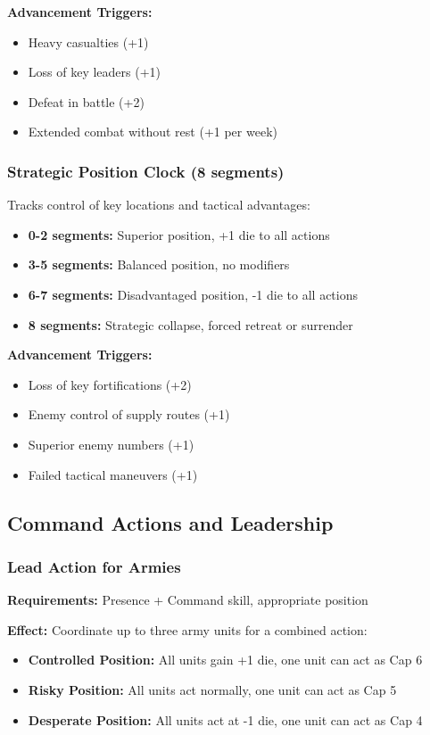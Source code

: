 \textbf{Advancement Triggers:}
\begin{itemize}[leftmargin=*]
    \item Heavy casualties (+1)
    \item Loss of key leaders (+1)
    \item Defeat in battle (+2)
    \item Extended combat without rest (+1 per week)
\end{itemize}

\subsubsection{Strategic Position Clock (8 segments)}
Tracks control of key locations and tactical advantages:
\begin{itemize}[leftmargin=*]
    \item \textbf{0-2 segments:} Superior position, +1 die to all actions
    \item \textbf{3-5 segments:} Balanced position, no modifiers
    \item \textbf{6-7 segments:} Disadvantaged position, -1 die to all actions
    \item \textbf{8 segments:} Strategic collapse, forced retreat or surrender
\end{itemize}

\textbf{Advancement Triggers:}
\begin{itemize}[leftmargin=*]
    \item Loss of key fortifications (+2)
    \item Enemy control of supply routes (+1)
    \item Superior enemy numbers (+1)
    \item Failed tactical maneuvers (+1)
\end{itemize}

\subsection{Command Actions and Leadership}

\subsubsection{Lead Action for Armies}
\textbf{Requirements:} Presence + Command skill, appropriate position

\textbf{Effect:} Coordinate up to three army units for a combined action:
\begin{itemize}[leftmargin=*]
    \item \textbf{Controlled Position:} All units gain +1 die, one unit can act as Cap 6
    \item \textbf{Risky Position:} All units act normally, one unit can act as Cap 5
    \item \textbf{Desperate Position:} All units act at -1 die, one unit can act as Cap 4
\end{itemize}


